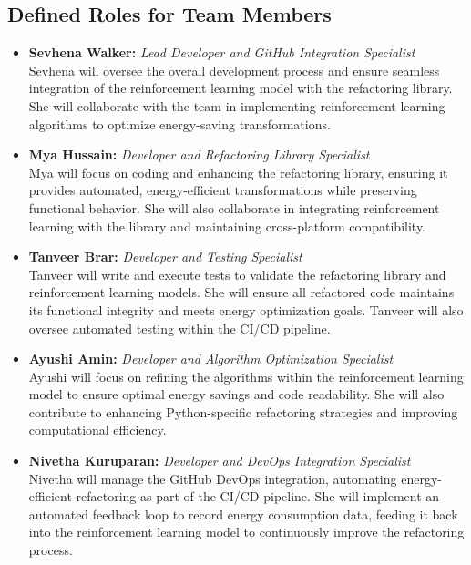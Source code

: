 \documentclass{article}
\begin{document}
\subsection*{Defined Roles for Team Members}
\begin{itemize}
    \item \textbf{Sevhena Walker:} \textit{Lead Developer and GitHub Integration Specialist} \\
    Sevhena will oversee the overall development process and ensure seamless integration of the reinforcement learning model with 
    the refactoring library. She will collaborate with the team in implementing reinforcement learning algorithms to optimize 
    energy-saving transformations.
    
    \item \textbf{Mya Hussain:} \textit{Developer and Refactoring Library Specialist} \\
    Mya will focus on coding and enhancing the refactoring library, ensuring it provides automated, energy-efficient transformations 
    while preserving functional behavior. She will also collaborate in integrating reinforcement learning with the library and 
    maintaining cross-platform compatibility.

    \item \textbf{Tanveer Brar:} \textit{Developer and Testing Specialist} \\
    Tanveer will write and execute tests to validate the refactoring library and reinforcement learning models. She will ensure all
     refactored code maintains its functional integrity and meets energy optimization goals. Tanveer will also oversee automated 
     testing within the CI/CD pipeline.

    \item \textbf{Ayushi Amin:} \textit{Developer and Algorithm Optimization Specialist} \\
    Ayushi will focus on refining the algorithms within the reinforcement learning model to ensure optimal energy savings and code 
    readability. She will also contribute to enhancing Python-specific refactoring strategies and improving computational efficiency.

    \item \textbf{Nivetha Kuruparan:} \textit{Developer and DevOps Integration Specialist} \\
    Nivetha will manage the GitHub DevOps integration, automating energy-efficient refactoring as part of the CI/CD pipeline. 
    She will implement an automated feedback loop to record energy consumption data, feeding it back into the reinforcement 
    learning model to continuously improve the refactoring process.
\end{itemize}
\end{document}
